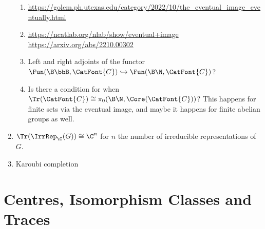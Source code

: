 \begin{enumerate}
\begin{enumerate}
            \item \url{https://golem.ph.utexas.edu/category/2022/10/the_eventual_image_eventually.html}
            \item \url{https://ncatlab.org/nlab/show/eventual+image}
                \url{https://arxiv.org/abs/2210.00302}
            \item Left and right adjoints of the functor $\Fun(\B\bbB,\CatFont{C})\hookrightarrow\Fun(\B\N,\CatFont{C})$?
            \item Is there a condition for when $\Tr(\CatFont{C})\cong\pi_{0}(\B\N,\Core(\CatFont{C}))$? This happens for finite sets via the eventual image, and maybe it happens for finite abelian groups as well.
        \end{enumerate}
    \item $\Tr(\IrrRep_{\C}(G))\cong\C^{n}$ for $n$ the number of irreducible representations of $G$.
    \item Karoubi completion
\end{enumerate}

\ChapterTableOfContents

\section{Centres, Isomorphism Classes and Traces}\label{section-centres-isomorphism-classes-and-traces}
